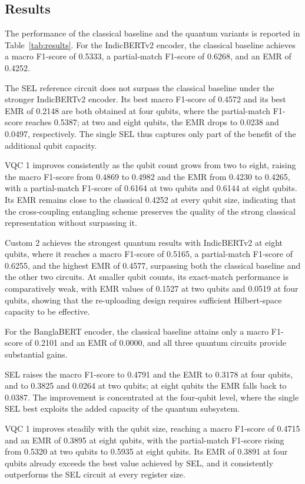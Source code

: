 \documentclass[runningheads]{llncs}
\begin{document}
\subsection{Results}\label{sec:results}
The performance of the classical baseline and the quantum variants is reported in Table~\ref{tab:results}. For the IndicBERTv2 encoder, the classical baseline achieves a macro F1-score of 0.5333, a partial-match F1-score of 0.6268, and an EMR of 0.4252.

The SEL reference circuit does not surpass the classical baseline under the stronger IndicBERTv2 encoder. Its best macro F1-score of 0.4572 and its best EMR of 0.2148 are both obtained at four qubits, where the partial-match F1-score reaches 0.5387; at two and eight qubits, the EMR drops to 0.0238 and 0.0497, respectively. The single SEL thus captures only part of the benefit of the additional qubit capacity.

VQC 1 improves consistently as the qubit count grows from two to eight, raising the macro F1-score from 0.4869 to 0.4982 and the EMR from 0.4230 to 0.4265, with a partial-match F1-score of 0.6164 at two qubits and 0.6144 at eight qubits. Its EMR remains close to the classical 0.4252 at every qubit size, indicating that the cross-coupling entangling scheme preserves the quality of the strong classical representation without surpassing it.

Custom 2 achieves the strongest quantum results with IndicBERTv2 at eight qubits, where it reaches a macro F1-score of 0.5165, a partial-match F1-score of 0.6255, and the highest EMR of 0.4577, surpassing both the classical baseline and the other two circuits. At smaller qubit counts, its exact-match performance is comparatively weak, with EMR values of 0.1527 at two qubits and 0.0519 at four qubits, showing that the re-uploading design requires sufficient Hilbert-space capacity to be effective.

For the BanglaBERT encoder, the classical baseline attains only a macro F1-score of 0.2101 and an EMR of 0.0000, and all three quantum circuits provide substantial gains.

SEL raises the macro F1-score to 0.4791 and the EMR to 0.3178 at four qubits, and to 0.3825 and 0.0264 at two qubits; at eight qubits the EMR falls back to 0.0387. The improvement is concentrated at the four-qubit level, where the single SEL best exploits the added capacity of the quantum subsystem.

VQC 1 improves steadily with the qubit size, reaching a macro F1-score of 0.4715 and an EMR of 0.3895 at eight qubits, with the partial-match F1-score rising from 0.5320 at two qubits to 0.5935 at eight qubits. Its EMR of 0.3891 at four qubits already exceeds the best value achieved by SEL, and it consistently outperforms the SEL circuit at every register size.
\end{document}

